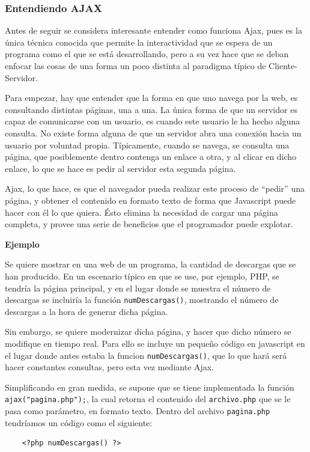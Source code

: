 \subsubsection{Entendiendo AJAX}
Antes de seguir se considera interesante entender como funciona Ajax, pues es la única técnica conocida que permite la interactividad que se espera de un programa como el que se está desarrollando, pero a su vez hace que se deban enfocar las cosas de una forma un poco distinta al paradigma típico de Cliente-Servidor.

Para empezar, hay que entender que la forma en que uno navega por la web, es consultando distintas páginas, una a una. La única forma de que un servidor es capaz de comunicarse con un usuario, es cuando este usuario le ha hecho alguna consulta. No existe forma alguna de que un servidor abra una conexión hacia un usuario por voluntad propia. Típicamente, cuando se navega, se consulta una página, que posiblemente dentro contenga un enlace a otra, y al clicar en dicho enlace, lo que se hace es pedir al servidor esta segunda página.

Ajax, lo que hace, es que el navegador pueda realizar este proceso de ``pedir'' una página, y obtener el contenido en formato texto de forma que Javascript puede hacer con él lo que quiera. Ésto elimina la necesidad de cargar una página completa, y provee una serie de beneficios que el programador puede explotar.

\textbf{Ejemplo}

Se quiere mostrar en una web de un programa, la cantidad de descargas que se han producido. En un escenario típico en que se use, por ejemplo, PHP, se tendría la página principal, y en el lugar donde se muestra el número de descargas se incluiría la función \texttt{numDescargas()}, mostrando el número de descargas a la hora de generar dicha página.

Sin embargo, se quiere modernizar dicha página, y hacer que dicho número se modifique en tiempo real. Para ello se incluye un pequeño código en javascript en el lugar donde antes estaba la funcion \texttt{numDescargas()}, que lo que hará será hacer constantes consultas, pero esta vez mediante Ajax.

Simplificando en gran medida, se supone que se tiene implementada la función \texttt{ajax("pagina.php");}, la cual retorna el contenido del \texttt{archivo.php} que se le pasa como parámetro, en formato texto. Dentro del archivo \texttt{pagina.php} tendríamos un código como el siguiente:
\begin{verbatim}
	<?php numDescargas() ?>
\end{verbatim}

